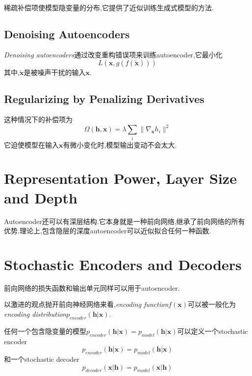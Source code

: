 稀疏补偿项使模型隐变量的分布,它提供了近似训练生成式模型的方法.

\subsection{Denoising Autoencoders}

\textit{Denoising autoencoders}通过改变重构错误项来训练autoencoder,它最小化
\begin{equation}
L(\mathbf x,g(f(\tilde{\mathbf x})))
\end{equation}
其中,$\tilde{\mathbf x}$是被噪声干扰的输入$\mathbf x$.

\subsection{Regularizing by Penalizing Derivatives}

这种情况下的补偿项为
\begin{equation}
\Omega(\mathbf{h,x})=\lambda\sum_i\|\nabla_{\mathbf x}h_i\|^2
\end{equation}
它迫使模型在输入$\mathbf x$有微小变化时,模型输出变动不会太大.

\section{Representation Power, Layer Size and Depth}

Autoencoder还可以有深层结构.它本身就是一种前向网络,继承了前向网络的所有优势.理论上,包含隐层的深度autoencoder可以近似拟合任何一种函数.

\section{Stochastic Encoders and Decoders}

前向网络的损失函数和输出单元同样可以用于autoencoder.

以激进的观点抛开前向神经网络来看,\textit{encoding function}$f(\mathbf x)$可以被一般化为\textit{encoding distribution}$p_{encoder}(\mathbf{h|x})$.

任何一个包含隐变量的模型$p_{encoder}(\mathbf{h|x})=p_{model}(\mathbf{h|x})$可以定义一个stochastic encoder
\begin{equation}
p_{encoder}(\mathbf{h|x})=p_{model}(\mathbf{h|x})
\end{equation}
和一个stochastic decoder
\begin{equation}
p_{decoder}(\mathbf{x|h})=p_{model}(\mathbf{x|h})
\end{equation}